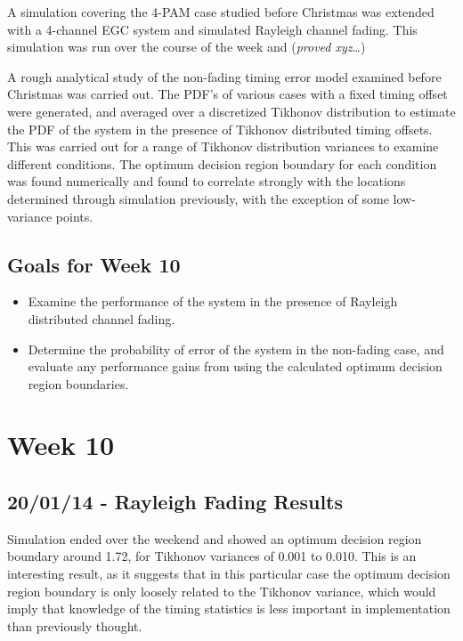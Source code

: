 A simulation covering the 4-PAM case studied before Christmas was
extended with a 4-channel EGC system and simulated Rayleigh channel
fading. This simulation was run over the course of the week and
(\emph{proved xyz}\ldots{})

A rough analytical study of the non-fading timing error model examined
before Christmas was carried out. The PDF's of various cases with a
fixed timing offset were generated, and averaged over a discretized
Tikhonov distribution to estimate the PDF of the system in the presence
of Tikhonov distributed timing offsets. This was carried out for a range
of Tikhonov distribution variances to examine different conditions. The
optimum decision region boundary for each condition was found
numerically and found to correlate strongly with the locations
determined through simulation previously, with the exception of some
low-variance points.

\subsection{Goals for Week 10}

\begin{itemize}
\itemsep1pt\parskip0pt
\item
  Examine the performance of the system in the presence of Rayleigh
  distributed channel fading.
\item
  Determine the probability of error of the system in the non-fading
  case, and evaluate any performance gains from using the calculated
  optimum decision region boundaries.
\end{itemize}

\section{Week 10}

\subsection{20/01/14 - Rayleigh Fading Results}

Simulation ended over the weekend and showed an optimum decision region
boundary around 1.72, for Tikhonov variances of 0.001 to 0.010. This is
an interesting result, as it suggests that in this particular case the
optimum decision region boundary is only loosely related to the Tikhonov
variance, which would imply that knowledge of the timing statistics is
less important in implementation than previously thought.

